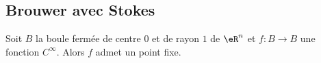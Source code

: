\subsection{Brouwer avec Stokes}

\begin{proposition}     \label{PropDRpYwv}
	Soit \( B\) la boule fermée de centre \( 0\) et de rayon \( 1\) de \( \eR^n\) et \( f\colon B\to B\) une fonction \(  C^{\infty}\). Alors \( f\) admet un point fixe.
\end{proposition}

